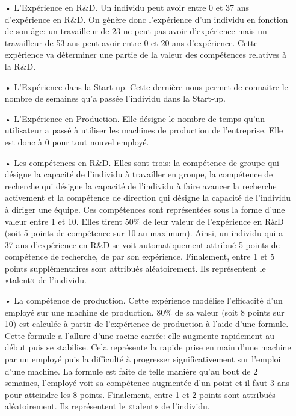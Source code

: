\begin{itemize}
    \item[•] L’Expérience en R\&D. Un individu peut avoir entre 0 et 37 ans d’expérience en R\&D. On génère donc l’expérience d’un individu en fonction de son âge: un travailleur de 23 ne peut pas avoir d’expérience mais un travailleur de 53 ans peut avoir entre 0 et 20 ans d’expérience. Cette expérience va déterminer une partie de la valeur des compétences relatives à la R\&D.\\


    \item[•] L’Expérience dans la Start-up. Cette dernière nous permet de connaitre le nombre de semaines qu’a passée l’individu dans la Start-up.\\


    \item[•] L’Expérience en Production. Elle désigne le nombre de temps qu’un utilisateur a passé à utiliser les machines de production de l’entreprise. Elle est donc à 0 pour tout nouvel employé.\\


    \item[•] Les compétences en R\&D. Elles sont trois: la compétence de groupe qui désigne la capacité de l’individu à travailler en groupe, la compétence de recherche qui désigne la capacité de l’individu à faire avancer la recherche activement et la compétence de direction qui désigne la capacité de l’individu à diriger une équipe. Ces compétences sont représentées sous la forme d’une valeur entre 1 et 10. Elles tirent 50\% de leur valeur de l’expérience en R\&D (soit 5 points de compétence sur 10 au maximum). Ainsi, un individu qui a 37 ans d’expérience en R\&D se voit automatiquement attribué 5 points de compétence de recherche, de par son expérience. Finalement, entre 1 et 5 points supplémentaires sont attribués aléatoirement. Ils représentent le «talent» de l’individu.\\


    \item[•] La compétence de production. Cette expérience modélise l’efficacité d’un employé sur une machine de production. 80\% de sa valeur (soit 8 points sur 10) est calculée à partir de l’expérience de production à l’aide d’une formule. Cette formule a l’allure d’une racine carrée: elle augmente rapidement au début puis se stabilise. Cela représente la rapide prise en main d’une machine par un employé puis la difficulté à progresser significativement sur l’emploi d’une machine. La formule est faite de telle manière qu’au bout de 2 semaines, l’employé voit sa compétence augmentée d’un point et il faut 3 ans pour atteindre les 8 points. Finalement, entre 1 et 2 points sont attribués aléatoirement. Ils représentent le «talent» de l’individu. 
\end{itemize}



